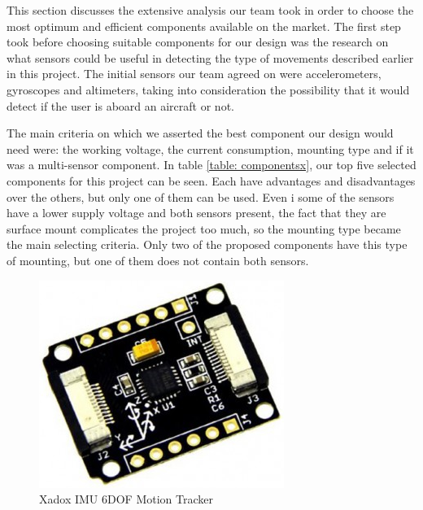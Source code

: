 This section discusses the extensive analysis our team took in order to choose the most optimum and efficient components available on the market. The first step took before choosing suitable components for our design was the research on what sensors could be useful in detecting the type of movements described earlier in this project. The initial sensors our team agreed on were accelerometers, gyroscopes and altimeters, taking into consideration the possibility that it would detect if the user is aboard an aircraft or not.

The main criteria on which we asserted the best component our design would need were: the working voltage, the current consumption, mounting type and if it was a multi-sensor component. In table \ref{table: componentsx}, our top five selected components for this project can be seen. Each have advantages and disadvantages over the others, but only one of them can be used. Even i some of the sensors have a lower supply voltage and both sensors present, the fact that they are surface mount complicates the project too much, so the mounting type became the main selecting criteria. Only two of the proposed components have this type of mounting, but one of them does not contain both sensors.
\begin{figure}
\centering
\includegraphics[scale=0.4]{figures/Xadow_IMU_6DOF.PNG}
\caption{Xadox IMU 6DOF Motion Tracker \label{fig:xadox}}
\end{figure}

